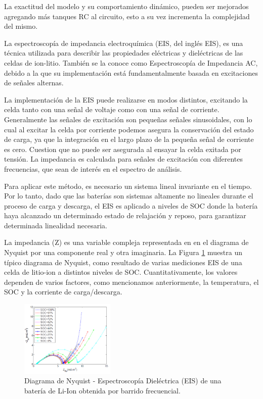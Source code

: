 \documentclass[10pt,a4paper]{article}
\newcounter{subsubsubsection}[subsubsection]
\begin{document}
\noindent La exactitud del modelo y su comportamiento din\'amico, pueden ser 
mejorados agregando m\'as tanques RC al circuito, esto a su vez incrementa la
complejidad del mismo. 


La espectroscopía de impedancia electroquímica (\acrshort{EIS}, del ingl\'es
\acrlong{EIS}), es una técnica utilizada para describir las propiedades
eléctricas y dieléctricas de las celdas de ion-litio. También se la conoce como
Espectroscopía de Impedancia AC, debido a la que su implementación está
fundamentalmente basada en excitaciones de señales alternas.

La implementación de la EIS puede realizarse en modos distintos, excitando la
celda tanto con una señal de voltaje como con una señal de corriente.
Generalmente las señales de excitación son pequeñas señales sinusoidales, con lo
cual al excitar la celda por corriente podemos asegura la conservación del
estado de carga, ya que la integración en el largo plazo de la pequeña señal de
corriente es cero. Cuestion que no puede ser asegurada al ensayar la celda
exitada por tensión. La impedancia es calculada para señales de excitación con
diferentes frecuencias, que sean de interés en el espectro de análisis.

Para aplicar este m\'etodo, es necesario un sistema lineal invariante en el
tiempo. Por lo tanto, dado que las bater\'ias son sistemas altamente no lineales
durante el proceso de carga y descarga, el \acrshort{EIS} es aplicado a niveles
de \acrshort{SOC} donde la bater\'ia haya alcanzado un determinado estado de
relajación y reposo, para garantizar determinada linealidad necesaria.

\noindent La impedancia (Z) es una variable compleja representada en en el 
diagrama de Nyquist por una componente real y otra imaginaria. 
La Figura \ref{EIS_Nyquist} muestra un t\'ipico diagrama de Nyquist, 
como resultado de varias mediciones \acrshort{EIS} de una celda de litio-ion a
distintos niveles de \acrshort{SOC}. Cuantitativamente, los valores dependen de 
varios factores, como mencionamos anteriormente, la temperatura, 
el \acrshort{SOC} y la corriente de carga/descarga.

\begin{figure}[h!]
    \begin{center}
	\includegraphics[width=0.4\textwidth]{EIS_Nyquist.png}
	\caption{Diagrama de Nyquist - Espectroscopía Dieléctrica (EIS) de 
	una batería de Li-Ion obtenida por barrido frecuencial.}
	\label{EIS_Nyquist}
    \end{center}
\end{figure}
\FloatBarrier
\end{document}
